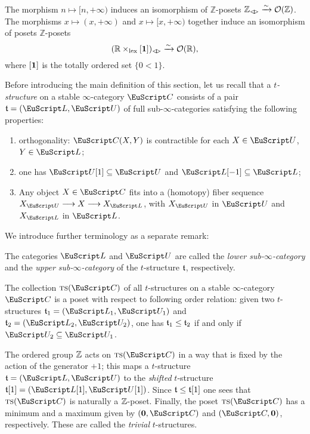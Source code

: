 \begin{example}\label{ex.Z-and-R}
The morphism $n\mapsto [n,+\infty)$ induces an isomorphism of $\mathbb{Z}$-posets $\mathbb{Z}_{\bowtie}\xrightarrow{\sim} \O(\mathbb{Z})$. The morphisms $x\mapsto (x,+\infty)$ and $x\mapsto [x,+\infty)$ together induce an isomorphism of posets $\mathbb{Z}$-posets
\[
(\mathbb{R}\times_{\mathrm{lex}} \uno)_{\bowtie}\xrightarrow{\sim} \O(\mathbb{R}),
\]
where $[\mathbf{1}] $ is the totally ordered set $\{0 < 1\}$.
\end{example}
\begin{definition}
Before introducing the main definition of this section, let us recall that a \emph{$t$-structure} on a stable $\infty$-category $\C$ consists of a pair $\tee=(\cate{L},\cate{U})$ of full sub-$\infty$-categories satisfying the following properties:
\begin{enumerate}[label=$\roman*$)]
\item orthogonality: $\C(X, Y)$ is  contractible for each $X\in \cate{U}$, $Y\in \cate{L}$;
\item one has $\cate{U}[1]\subseteq \cate{U}$ and $\cate{L}[-1]\subseteq \cate{L}$;
\item Any object $X\in\C$ fits into a (homotopy) fiber sequence $X_{\cate{U}}\to X\to X_{\cate{L}}$, with $X_{\cate{U}}$ in $\cate{U}$ and $X_{\cate{L}}$ in $\cate{L}$. 
\end{enumerate}
\end{definition}
We introduce further terminology as a separate remark:
\begin{remark}
The categories $\cate{L}$ and $\cate{U}$ are called the \emph{lower sub-$\infty$-category} and the \emph{upper sub-$\infty$-category} of the $t$-structure $\mathfrak{t}$, respectively. 

The collection $\ts(\C)$ of all $t$-structures on a stable $\infty$-category $\C$ is a poset with respect to following order relation: given two $t$-structures $\tee_1=(\cate{L}_1, \cate{U}_1)$ and  $\tee_2=(\cate{L}_2, \cate{U}_2)$, one has  $\mathfrak{t}_1 \leq \mathfrak{t}_2$ if and only if $\cate{U}_2\subseteq \cate{U}_1$. 

The ordered group $\mathbb{Z} $ acts on $\ts(\C)$ in a way that is fixed by the action of the generator $+1$; this maps a $t$-structure $\tee=(\cate{L},\cate{U})$ to the \emph{shifted} $t$-structure $\tee[1]=(\cate{L}[1],\cate{U}[1])$. Since $\mathfrak{t}\leq\mathfrak{t}[1]$ one sees that $\ts(\C)$ is naturally a $\mathbb{Z} $-poset. Finally, the poset $\ts(\C)$ has a minimum and a maximum given by $(\mathbf{0},\C)$ and $(\C,\mathbf{0})$, respectively. These are called the \emph{trivial} $t$-structures.
\end{remark}
